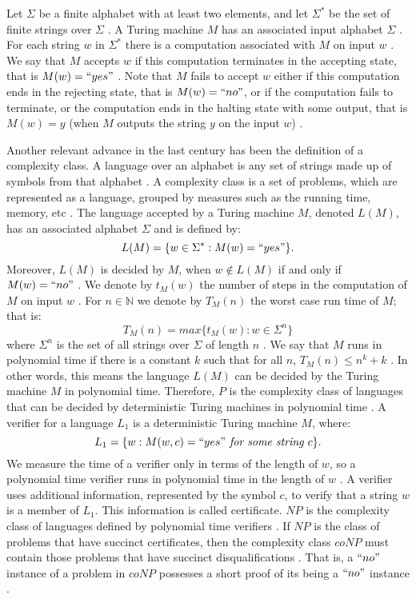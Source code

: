 \documentclass[a4paper,UKenglish,cleveref, autoref]{lipics-v2019}
\begin{document}
Let $\Sigma$ be a finite alphabet with at least two elements, and let $\Sigma^{*}$ be the set of finite strings over $\Sigma$ \cite{AB09}. A Turing machine $M$ has an associated input alphabet $\Sigma$ \cite{AB09}. For each string $w$ in $\Sigma^{*}$ there is a computation associated with $M$ on input $w$ \cite{AB09}. We say that $M$ accepts $w$ if this computation terminates in the accepting state, that is $M(w)=``yes"$ \cite{AB09}. Note that $M$ fails to accept $w$ either if this computation ends in the rejecting state, that is $M(w)=``no"$, or if the computation fails to terminate, or the computation ends in the halting state with some output, that is $M(w)=y$ (when $M$ outputs the string $y$ on the input $w$) \cite{AB09}.

Another relevant advance in the last century has been the definition of a complexity class. A language over an alphabet is any set of strings made up of symbols from that alphabet \cite{CLRS01}. A complexity class is a set of problems, which are represented as a language, grouped by measures such as the running time, memory, etc \cite{CLRS01}. The language accepted by a Turing machine $M$, denoted $L(M)$, has an associated alphabet $\Sigma$ and is defined by:
\[L(M) = \{w \in \Sigma^{*}: M(w)=``yes" \}.\]
Moreover, $L(M)$ is decided by $M$, when $w \notin L(M)$ if and only if $M(w)=``no"$ \cite{CLRS01}. We denote by $t_{M}(w)$ the number of steps in the computation of $M$ on input $w$ \cite{AB09}. For $n \in \mathbb{N}$ we denote by $T_{M}(n)$ the worst case run time of $M$; that is:
\[T_{M}(n) = max\{t_{M}(w): w \in \Sigma^{n} \}\]
where $\Sigma^{n}$ is the set of all strings over $\Sigma$ of length $n$ \cite{AB09}. We say that $M$ runs in polynomial time if there is a constant $k$ such that for all $n$, $T_{M}(n) \leq n^{k} + k$ \cite{AB09}. In other words, this means the language $L(M)$ can be decided by the Turing machine $M$ in polynomial time. Therefore, $P$ is the complexity class of languages that can be decided by deterministic Turing machines in polynomial time \cite{CLRS01}. A verifier for a language $L_{1}$ is a deterministic Turing machine $M$, where:
\[L_{1} = \{w: M(w, c) = ``yes" \textit{ for some string } c\}.\]
We measure the time of a verifier only in terms of the length of $w$, so a polynomial time verifier runs in polynomial time in the length of $w$ \cite{AB09}. A verifier uses additional information, represented by the symbol $c$, to verify that a string $w$ is a member of $L_{1}$. This information is called certificate. $NP$ is the complexity class of languages defined by polynomial time verifiers \cite{Pap03}. If $NP$ is the class of problems that have succinct certificates, then the complexity class $coNP$ must contain those problems that have succinct disqualifications \cite{Pap03}. That is, a $``no"$ instance of a problem in $coNP$ possesses a short proof of its being a $``no"$ instance \cite{Pap03}.
\end{document}
